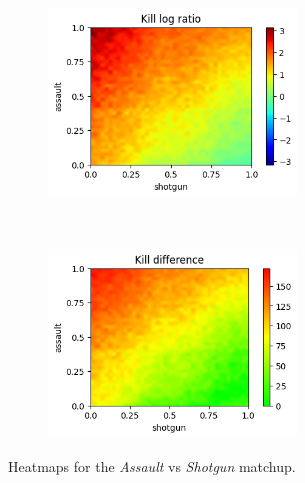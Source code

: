 \begin{figure}[H]
    \centering
    \begin{subfigure}[t]{0.5\textwidth}
        \centering
        \includegraphics[height=5cm]{Images/images/heatmaps/long-range/assault_shotgun_heatmap_ratio.png}
    \end{subfigure}%
    ~ 
    \begin{subfigure}[t]{0.5\textwidth}
        \centering
        \includegraphics[height=5cm]{Images/images/heatmaps/long-range/assault_shotgun_heatmap_diff.png}
    \end{subfigure}
    \caption{Heatmaps for the \textit{Assault} vs \textit{Shotgun} matchup.}
    \label{fig:balance_assault_shotgun_long}
\end{figure}

